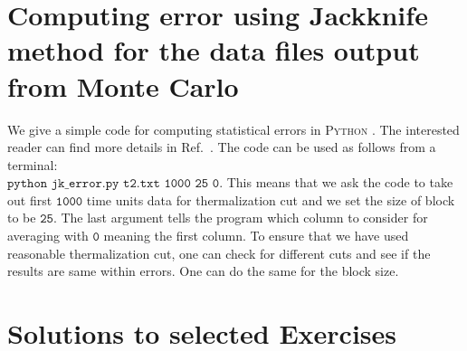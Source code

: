 \documentclass[11pt]{article}
\newcommand{\PY}{\textsc{Python }}
\begin{document}
\begin{footnotesize} 
	\begin{mdframed}[backgroundcolor=mauve!3] 
			
	\end{mdframed} 
\end{footnotesize}


\section{Computing error using Jackknife method for the data files output from Monte Carlo}

We give a simple code for computing statistical errors in \PY. The interested reader can find more details in Ref.~\cite{2012arXiv1210.3781Y}. The code can be used as follows from a terminal: \\ 
$\texttt{python jk\_error.py t2.txt 1000 25 0}$. This means that we ask the code to take out first $\texttt{1000}$ time units data for thermalization cut and we set the size of block to be $\texttt{25}$. The last argument tells the program which column to consider for averaging with $\texttt{0}$ meaning the first column. To ensure that we have used reasonable thermalization cut, one can check for different cuts and see if the results 
are same within errors. One can do the same for the block size. 

\begin{footnotesize} 
	\begin{mdframed}[backgroundcolor=mauve!3] 
			
	\end{mdframed} 
\end{footnotesize}

\section{\label{sec:solutions}Solutions to selected Exercises} 
\end{document}
